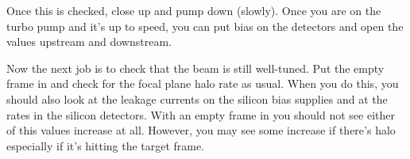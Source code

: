 \documentclass[11pt]{report}
\begin{document}
Once this is checked, close up and pump down (slowly). Once you are on the turbo pump and it's up to speed, you can put bias on the detectors and open the values upstream and downstream.

Now the next job is to check that the beam is still well-tuned. Put the empty frame in and check for the focal plane halo rate as usual. When you do this, you should also look at the leakage currents on the silicon bias supplies and at the rates in the silicon detectors. With an empty frame in you should not see either of this values increase at all. However, you may see some increase if there's halo especially if it's hitting the target frame.






\bigskip




\newpage
\listoftables
\listoffigures
\end{document}
